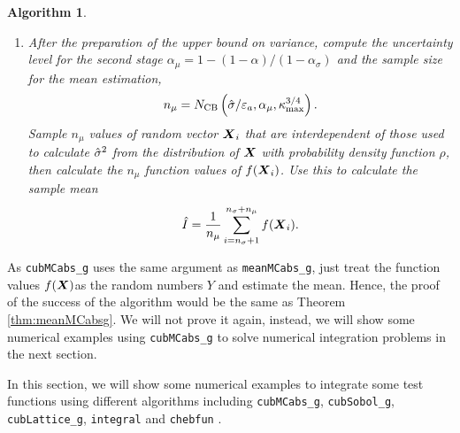 \documentclass{iitthesis}
\newtheorem{algorithm}[theorem]{Algorithm}
\theoremstyle{definition}
\begin{document}
\begin{algorithm}
\begin{enumerate}
\item After the preparation of the upper bound on variance, compute the uncertainty level for the second stage $\alpha_\mu = 1-(1-\alpha)/(1-\alpha_{\sigma})$ and the sample size for the mean estimation,
\begin{align}
n_\mu = N_{\text{CB}} \left(\hat{\sigma}/\varepsilon_a,\alpha_\mu, \kappa_{\max}^{3/4}\right).
\end{align}
Sample $n_\mu$ values of random vector $\boldsymbol{X}_i$ that are interdependent of those used to calculate $\hat{\sigma}^2$ from the distribution of $\boldsymbol{X}$ with probability density function $\rho$, then calculate the $n_\mu$ function values of $f(\boldsymbol{X}_i)$. Use this to calculate the sample mean 
\begin{align}\label{hmun}
\hat{I}= \frac{1}{n_\mu}\sum_{i = n_\sigma+1}^{n_\sigma+n_\mu}f(\boldsymbol{X}_i).
\end{align}
\end{enumerate}
\end{algorithm}
As {\tt cubMCabs\_g} uses the same argument as {\tt meanMCabs\_g}, just treat the function values $f(\boldsymbol{X}) $as the random numbers $Y$ and estimate the mean. Hence, the proof of the success of the algorithm would be the same as Theorem \ref{thm:meanMCabsg}. We will not prove it again,  instead, we will show some numerical examples using {\tt cubMCabs\_g} to solve numerical integration problems in the next section.


In this section, we will show some numerical examples to integrate some test functions using different algorithms including {\tt cubMCabs\_g}, {\tt cubSobol\_g}\cite{HicJim16a},\\ {\tt cubLattice\_g}\cite{JimHic16a}, {\tt integral}\cite{Shampone08} and {\tt chebfun} \cite{Chebfun14}.
\end{document}
